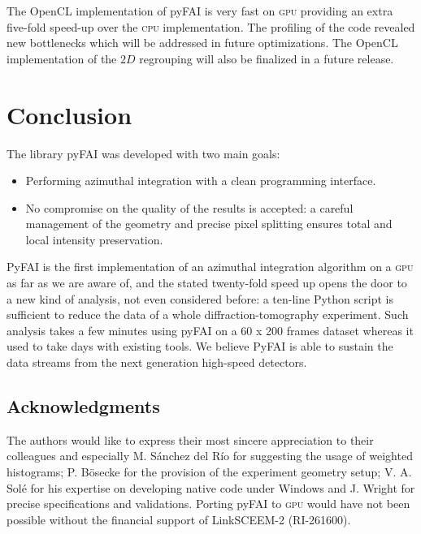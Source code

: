 \documentclass[a4paper]{jpconf}
\begin{document}
The OpenCL implementation of pyFAI is very fast on \textsc{gpu} providing an
extra five-fold speed-up over the \textsc{cpu} implementation. The
profiling of the code revealed new bottlenecks which will be addressed in future
optimizations. The OpenCL implementation of the $2D$ regrouping will also be
finalized in a future release.

\section{Conclusion}
The library pyFAI was developed with two main goals:
\begin{itemize}
\item Performing azimuthal integration with a clean programming interface.
\item No compromise on the quality of the results is accepted: a careful
management of the geometry and precise pixel splitting ensures total and
local intensity preservation.
\end{itemize}
PyFAI is the first implementation of an azimuthal integration algorithm on
a \textsc{gpu} as far as we are aware of, and the stated twenty-fold speed up
opens the door to a new kind of analysis, not even considered before:
a ten-line Python script is sufficient to reduce the data of a whole
diffraction-tomography experiment. Such analysis takes a few minutes using
pyFAI on a 60 x 200 frames dataset whereas it used to take days with existing
tools.
We believe PyFAI is able to sustain the data streams from the next generation
high-speed detectors.

\subsection*{Acknowledgments}
The authors would like to express their most sincere appreciation to their
colleagues and especially M. S\'anchez del R\'io for suggesting
the usage of weighted histograms; P. B\"osecke for the provision of the
experiment geometry setup; V. A. Sol\'e for his expertise on developing  native
code under Windows and J. Wright for precise specifications and validations.
Porting pyFAI to \textsc{gpu} would have not been possible without the financial
support of LinkSCEEM-2 (RI-261600).
\end{document}

